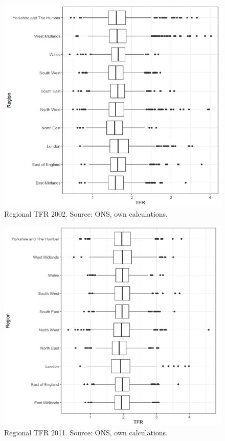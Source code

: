 \documentclass[12pt,twoside]{reedthesis}
\begin{document}
\begin{figure}
\includegraphics[width=0.95\linewidth]{figure/Figure_5a} \caption{Regional TFR 2002. Source: ONS, own calculations.}\label{fig:figure5a}
\end{figure}
\begin{figure}
\includegraphics[width=0.95\linewidth]{figure/Figure_5b} \caption{Regional TFR 2011. Source: ONS, own calculations.}\label{fig:figure5b}
\end{figure}
\end{document}
